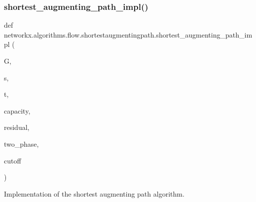 \subsubsection{\texorpdfstring{shortest\+\_\+augmenting\+\_\+path\+\_\+impl()}{shortest\_augmenting\_path\_impl()}}
{\footnotesize\ttfamily def networkx.\+algorithms.\+flow.\+shortestaugmentingpath.\+shortest\+\_\+augmenting\+\_\+path\+\_\+impl (\begin{DoxyParamCaption}\item[{}]{G,  }\item[{}]{s,  }\item[{}]{t,  }\item[{}]{capacity,  }\item[{}]{residual,  }\item[{}]{two\+\_\+phase,  }\item[{}]{cutoff }\end{DoxyParamCaption})}

\begin{DoxyVerb}Implementation of the shortest augmenting path algorithm.\end{DoxyVerb}
 